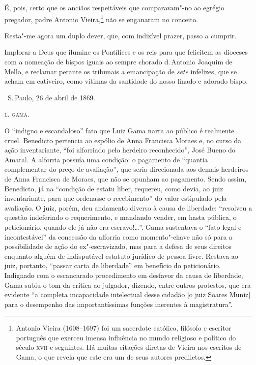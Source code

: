 É, pois, certo que os anciãos respeitáveis que comparavam"-no ao egrégio
pregador, padre Antonio Vieira,\footnote{Antonio Vieira (1608--1697) foi
  um sacerdote católico, filósofo e escritor português que exerceu
  imensa influência no mundo religioso e político do século \textsc{xvii} e
  seguintes. Há muitas citações diretas de Vieira nos escritos de Gama,
  o que revela que este era um de seus autores prediletos.}
não se enganaram no conceito.

Resta"-me agora um duplo dever, que, com indizível prazer, passo a
cumprir.

Implorar a Deus que ilumine os Pontífices e os reis para que felicitem
as dioceses com a nomeação de bispos iguais ao sempre chorado d.\,Antonio
Joaquim de Mello, e reclamar perante os tribunais a emancipação de
\emph{sete} infelizes, que se acham em cativeiro, como vítimas da
santidade do nosso finado e adorado bispo.

\medskip

\hfill\ S.\,Paulo, 26 de abril de 1869.\smallskip

\hfill\textsc{l. gama.}

\pagebreak
\mbox{}\vfill
\thispagestyle{empty}

{\small\noindent
O ``indigno e escandaloso'' fato que Luiz Gama narra ao público é
realmente cruel. Benedicto pertencia ao espólio de Anna Francisca Moraes
e, no curso da ação inventariante, ``foi alforriado pelo herdeiro
reconhecido'', José Bueno do Amaral. A alforria possuía uma condição: o
pagamento de ``quantia complementar do preço de avaliação'', que seria
direcionada aos demais herdeiros de Anna Francisca de Moraes, que não se
opunham ao pagamento. Sendo assim, Benedicto, já na ``condição de estatu
liber, requereu, como devia, ao juiz inventariante, para que ordenasse o
recebimento'' do valor estipulado pela avaliação. O juiz, porém, deu
andamento diverso à causa de liberdade: ``resolveu a questão indeferindo
o requerimento, e mandando vender, em hasta pública, o peticionário,
quando ele já não era escravo!\ldots{}''. Gama sustentava o ``fato legal e
incontestável'' da concessão da alforria como momento"-chave não só para a
possibilidade de ação do ex"-escravizado, mas para a defesa de seus
direitos enquanto alguém de indisputável estatuto jurídico de pessoa
livre. Restava ao juiz, portanto, ``passar carta de liberdade'' em
benefício do peticionário. Indignado com o escancarado procedimento em
desfavor da causa de liberdade, Gama subiu o tom da crítica ao julgador,
dizendo, entre outros protestos, que era evidente ``a completa
incapacidade intelectual desse cidadão {[}o juiz Soares Muniz{]} para o
desempenho das importantíssimas funções inerentes à magistratura''.}

